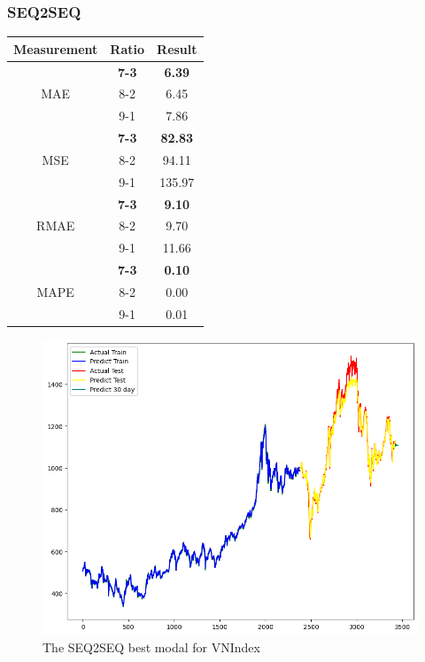\documentclass{ieeeojies}
\begin{document}
\subsubsection{SEQ2SEQ}
\begin{table}[H]
    \centering
    \begin{tabular}{|c|c|c|}
        \hline
         Measurement & Ratio &  Result  \\
        \hline
             & \textbf{7-3} & \textbf{6.39} \\
        MAE  & 8-2 & 6.45  \\
            & 9-1 & 7.86 \\
        \hline
           &\textbf{ 7-3} & \textbf{82.83}  \\
        MSE  & 8-2 & 94.11 \\
            & 9-1 & 135.97  \\
        \hline
           & \textbf{7-3} & \textbf{9.10} \\
        RMAE  & 8-2 & 9.70  \\
            & 9-1 & 11.66 \\
        \hline
           & \textbf{7-3} & \textbf{0.10}  \\
        MAPE  & 8-2 & 0.00  \\
            & 9-1 & 0.01 \\
        \hline
    \end{tabular}
    \label{table:example}
\end{table}

\begin{figure}[H]
    \centering
    \includegraphics[width=0.8\linewidth]{SE VNI 73.jpg}
    \caption{The SEQ2SEQ best modal for VNIndex}
    \label{fig:example}
\end{figure}
\end{document}
